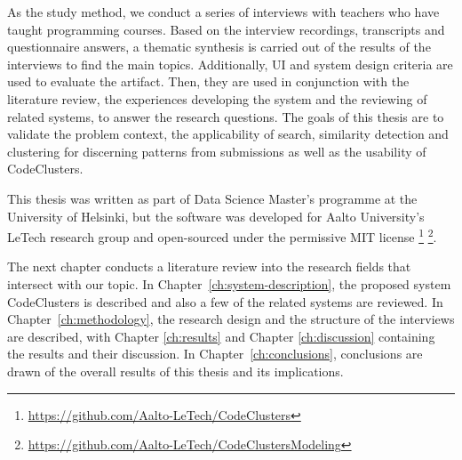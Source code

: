 As the study method, we conduct a series of interviews with teachers who have taught programming courses. Based on the interview recordings, transcripts and questionnaire answers, a thematic synthesis is carried out of the results of the interviews to find the main topics. Additionally, UI and system design criteria are used to evaluate the artifact. Then, they are used in conjunction with the literature review, the experiences developing the system and the reviewing of related systems, to answer the research questions. The goals of this thesis are to validate the problem context, the applicability of search, similarity detection and clustering for discerning patterns from submissions as well as the usability of CodeClusters.

This thesis was written as part of Data Science Master's programme at the University of Helsinki, but the software was developed for Aalto University's LeTech research group and open-sourced under the permissive MIT license \footnote{\url{https://github.com/Aalto-LeTech/CodeClusters}} \footnote{\url{https://github.com/Aalto-LeTech/CodeClustersModeling}}.

The next chapter conducts a literature review into the research fields that intersect with our topic. In Chapter~\ref{ch:system-description}, the proposed system CodeClusters is described and also a few of the related systems are reviewed. In Chapter~\ref{ch:methodology}, the research design and the structure of the interviews are described, with Chapter \ref{ch:results} and Chapter \ref{ch:discussion} containing the results and their discussion. In Chapter~\ref{ch:conclusions}, conclusions are drawn of the overall results of this thesis and its implications.
